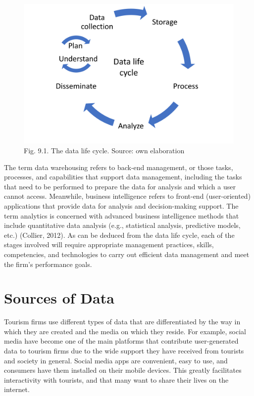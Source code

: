 \documentclass[
  letterpaper,
  DIV=11,
  numbers=noendperiod]{scrreprt}
\begin{document}
\begin{figure}

{\centering \includegraphics{img/fig9.png}

}

\caption{Fig. 9.1. The data life cycle. Source: own elaboration}

\end{figure}

The term data warehousing refers to back-end management, or those tasks,
processes, and capabilities that support data management, including the
tasks that need to be performed to prepare the data for analysis and
which a user cannot access. Meanwhile, business intelligence refers to
front-end (user-oriented) applications that provide data for analysis
and decision-making support. The term analytics is concerned with
advanced business intelligence methods that include quantitative data
analysis (e.g., statistical analysis, predictive models, etc.) (Collier,
2012). As can be deduced from the data life cycle, each of the stages
involved will require appropriate management practices, skills,
competencies, and technologies to carry out efficient data management
and meet the firm's performance goals.

\hypertarget{sources-of-data}{%
\section{Sources of Data}\label{sources-of-data}}

Tourism firms use different types of data that are differentiated by the
way in which they are created and the media on which they reside. For
example, social media have become one of the main platforms that
contribute user-generated data to tourism firms due to the wide support
they have received from tourists and society in general. Social media
apps are convenient, easy to use, and consumers have them installed on
their mobile devices. This greatly facilitates interactivity with
tourists, and that many want to share their lives on the internet.
\end{document}
